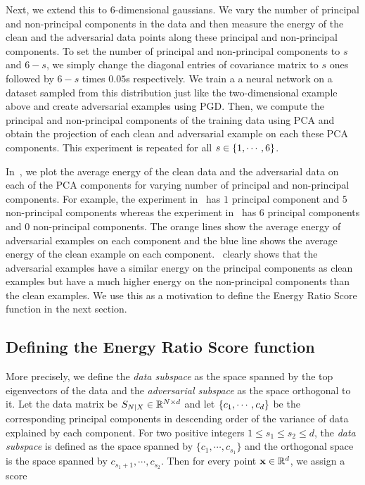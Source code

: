 Next, we extend this to \(6\)-dimensional gaussians. We vary the number of
principal and non-principal components in the data and then measure the energy
of the clean and the adversarial data points along these principal and
non-principal components. To set the number of principal and non-principal
components to \(s\) and \(6-s\), we simply change the diagonal entries of
covariance matrix to \(s\) ones followed by \(6-s\) times \(0.05\)s
respectively. We train a a neural network on a dataset sampled from this
distribution just like the two-dimensional example above and create adversarial
examples using PGD. Then, we compute the principal and non-principal components
of the training data using PCA and obtain the projection of each clean and
adversarial example on each these PCA components. This experiment is repeated
for all \(s\in\left\{{1,\cdots,6}\right\}\).

In~, we plot the average energy of the clean
data and the adversarial data on each of the PCA components for varying number
of principal and non-principal components. For example, the experiment
in~ has \(1\) principal component and \(5\) non-principal
components whereas the experiment in~ has \(6\) principal
components and \(0\) non-principal components. The {\color{orange} orange} lines show the average energy of adversarial examples on each component and the {\color{blue} blue} line shows the average energy of the clean example on each component.~ clearly shows that the adversarial examples have a similar energy on the principal components as clean examples but have a much higher energy on the non-principal components than the clean examples. We use this as a motivation to define the Energy Ratio Score function in the next section.


\subsection{Defining the Energy Ratio Score function}
More precisely, we define the {\em data subspace} as the space spanned by the
top eigenvectors of the data and the {\em adversarial subspace} as the space
orthogonal to it. Let the data matrix be \(S_{N\vert X}\in\mathbb{R}^{N\times d}\)
and let \(\left\{{c_1,\cdots,c_d}\right\}\) be the corresponding principal components in
descending order of the variance of data explained by each component. For two
positive integers \(1\le s_1\le s_2\le d\), the {\em data subspace} is defined
as the space spanned by \(\{c_1,\cdots,c_{s_1}\}\) and the orthogonal space is
the space spanned by \(c_{s_1+1},\cdots,c_{s_2}\). Then for every point
\({\mathbf{x}}\in\mathbb{R}^d\), we assign a score 

